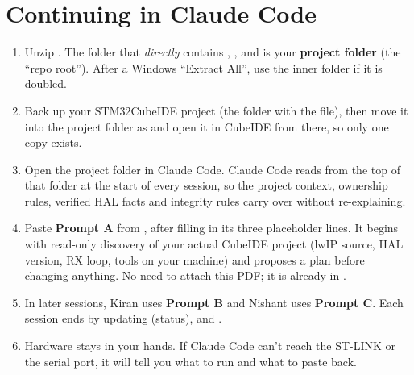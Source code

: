 \documentclass[10pt,a4paper]{article}
\begin{document}

\section{Continuing in Claude Code}\label{sec:claudecode}
\begin{enumerate}
  \item Unzip . The folder that \emph{directly} contains , ,  and  is your \textbf{project folder} (the ``repo root''). After a Windows ``Extract All'', use the inner folder if it is doubled.
  \item Back up your STM32CubeIDE project (the folder with the  file), then move it into the project folder as  and open it in CubeIDE from there, so only one copy exists.
  \item Open the project folder in Claude Code. Claude Code reads  from the top of that folder at the start of every session, so the project context, ownership rules, verified HAL facts and integrity rules carry over without re-explaining.
  \item Paste \textbf{Prompt A} from , after filling in its three placeholder lines. It begins with read-only discovery of your actual CubeIDE project (lwIP source, HAL version, RX loop, tools on your machine) and proposes a plan before changing anything. No need to attach this PDF; it is already in .
  \item In later sessions, Kiran uses \textbf{Prompt B} and Nishant uses \textbf{Prompt C}. Each session ends by updating  (status),  and .
  \item Hardware stays in your hands. If Claude Code can't reach the ST-LINK or the serial port, it will tell you what to run and what to paste back.
\end{enumerate}
\end{document}
